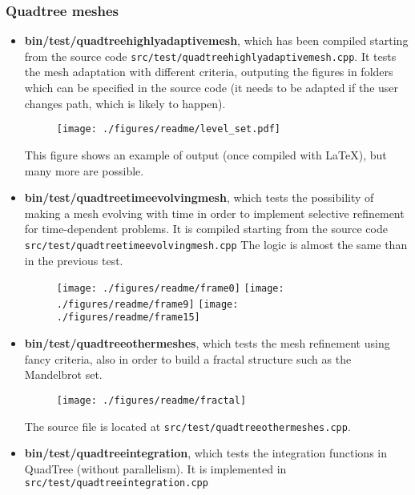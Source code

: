 \documentclass[a4paper,10pt]{article}
\begin{document}
 \subsubsection{Quadtree meshes}
 \begin{itemize}
 \item \textbf{bin/test/quadtree\textunderscore highly\textunderscore adaptive\textunderscore mesh}, which has been compiled starting from the source code \texttt{src/test/quadtree\textunderscore highly\textunderscore adaptive\textunderscore mesh.cpp}. It tests the mesh adaptation with different criteria, outputing the figures in folders which can be specified in the source code (it needs to be adapted if the user changes path, which is likely to happen).
 \begin{figure}[H]
\begin{center}
\texttt{[image: ./figures/readme/level\_set.pdf]}
\end{center}
\end{figure}
This figure shows an example of output (once compiled with \LaTeX), but many more are possible.
\item \textbf{bin/test/quadtree\textunderscore time\textunderscore evolving\textunderscore mesh}, which tests the possibility of making a mesh evolving with time in order to implement selective refinement for time-dependent problems. It is compiled starting from the source code \texttt{src/test/quadtree\textunderscore time\textunderscore evolving\textunderscore mesh.cpp}
The logic is almost the same than in the previous test.
 \begin{figure}[H]
\begin{center}
\texttt{[image: ./figures/readme/frame0]}
\texttt{[image: ./figures/readme/frame9]}
\texttt{[image: ./figures/readme/frame15]}
\end{center}
\end{figure}
\item \textbf{bin/test/quadtree\textunderscore other\textunderscore meshes}, which tests the mesh refinement using fancy criteria, also in order to build a fractal structure such as the Mandelbrot set.
 \begin{figure}[H]
\begin{center}
\texttt{[image: ./figures/readme/fractal]}
\end{center}
\end{figure}
The source file is located at \texttt{src/test/quadtree\textunderscore other\textunderscore meshes.cpp}.
\item \textbf{bin/test/quadtree\textunderscore integration}, which tests the integration functions in QuadTree (without parallelism). It is implemented in \texttt{src/test/quadtree\textunderscore integration.cpp} 
\end{itemize}
\end{document}
